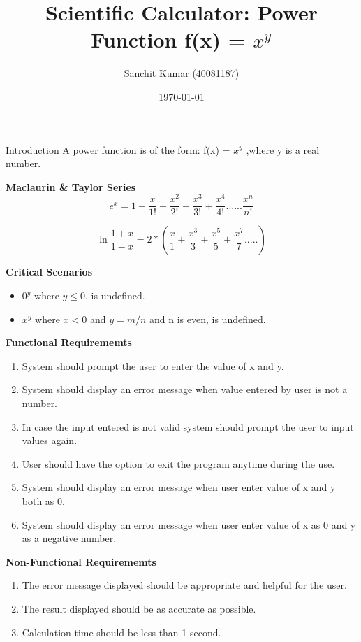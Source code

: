 \documentclass[final,hyperref={pdfpagelabels=false}]{beamer}
\title[ProjectName]{Scientific Calculator: Power Function f(x) = $x^y$}
\author[AuthorName]{Sanchit Kumar (40081187)}
\institute[UniversityName]{Concordia University, SOEN 6011 - Software Engineering Processes}
\date{\today}
\begin{document}
	\begin{frame}{} 
		
		\begin{block}{\Large Introduction}
			{\large A power function is of the form: f(x) = $x^y$ ,where y is a real number.}\par \vspace{1.5cm}
			
			\textbf{Maclaurin \& Taylor Series}
			\begin{equation} \label{exptaylor}
				e^x = 1 + \frac{x}{1!} + \frac{x^2}{2!}  + \frac{x^3}{3!} + \frac{x^4}{4!} ...... \frac{x^n}{n!}
			\end{equation}
			
			\begin{equation} \label{logtaylor}
			\ln{\frac{1+x}{1-x}} = 2 * ( \frac{x}{1} + \frac{x^3}{3} + \frac{x^5}{5} + \frac{x^7}{7}  .....)
			\end{equation}
			
			\textbf{\large{Critical Scenarios}}
			\begin{itemize}
				\item $0^y$ where $y \leq 0$, is undefined.
				\item $x^y$ where $x < 0$ and $y = m/n$ and n is even, is undefined.
			\end{itemize}
			
			\vspace{1cm}
			\textbf{\large{Functional Requirememts}}
			\begin{enumerate}
				\item System should prompt the user to enter the value of x and y.
				\item System should display an error message when value entered by user is not a number.
				\item In case the input entered is not valid system should prompt the user to input values again. 
				\item User should have the option to exit the program anytime during the use.
				\item System should display an error message when user enter value of x and y both as 0.
				\item System should display an error message when user enter value of x as 0 and y as a negative number.
			\end{enumerate}
			
			
			\textbf{\large{Non-Functional Requirememts}}
			\begin{enumerate}
				\item The error message displayed should be appropriate and helpful for the user. 
				\item The result displayed should be as accurate as possible.
				\item Calculation time should be less than 1 second.
			\end{enumerate}
			

\end{block}
\end{frame}
\end{document}
